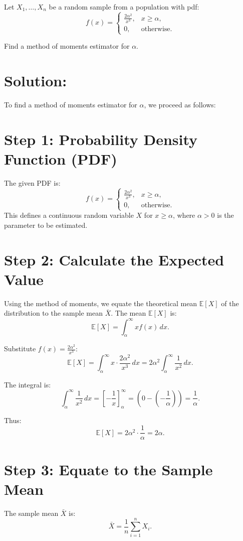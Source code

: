 \documentclass{article}
\begin{document}
Let $X_1, \dots, X_n$ be a random sample from a population with pdf:
\[
f(x) = 
\begin{cases} 
\frac{2\alpha^2}{x^3}, & x \geq \alpha, \\
0, & \text{otherwise}.
\end{cases}
\]

Find a method of moments estimator for $\alpha$.


\section*{Solution:}

To find a method of moments estimator for $\alpha$, we proceed as follows:

\section*{Step 1: Probability Density Function (PDF)}
The given PDF is:
\[
f(x) =
\begin{cases} 
\frac{2\alpha^2}{x^3}, & x \geq \alpha, \\
0, & \text{otherwise}.
\end{cases}
\]
This defines a continuous random variable $X$ for $x \geq \alpha$, where $\alpha > 0$ is the parameter to be estimated.

\section*{Step 2: Calculate the Expected Value}
Using the method of moments, we equate the theoretical mean $\mathbb{E}[X]$ of the distribution to the sample mean $\bar{X}$. The mean $\mathbb{E}[X]$ is:
\[
\mathbb{E}[X] = \int_{\alpha}^\infty x f(x) \, dx.
\]

Substitute $f(x) = \frac{2\alpha^2}{x^3}$:
\[
\mathbb{E}[X] = \int_{\alpha}^\infty x \cdot \frac{2\alpha^2}{x^3} \, dx = 2\alpha^2 \int_{\alpha}^\infty \frac{1}{x^2} \, dx.
\]

The integral is:
\[
\int_{\alpha}^\infty \frac{1}{x^2} \, dx = \left[ -\frac{1}{x} \right]_{\alpha}^\infty = \left( 0 - \left( -\frac{1}{\alpha} \right) \right) = \frac{1}{\alpha}.
\]

Thus:
\[
\mathbb{E}[X] = 2\alpha^2 \cdot \frac{1}{\alpha} = 2\alpha.
\]

\section*{Step 3: Equate to the Sample Mean}
The sample mean $\bar{X}$ is:
\[
\bar{X} = \frac{1}{n} \sum_{i=1}^n X_i.
\]
\end{document}
